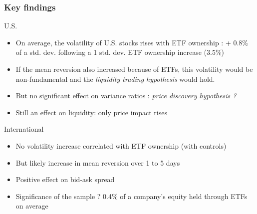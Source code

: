 \documentclass[handout, 9pt, usenames, dvipsnames]{beamer}
\begin{document}
\begin{frame}
  \frametitle{Key findings}
  \begin{block}{U.S.}
  \begin{itemize}
  \item On average, the volatility of U.S. stocks rises with ETF ownership : + 0.8\% of a std. dev. following a 1 std. dev. ETF ownership increase (3.5\%)
  \item If the mean reversion also increased because of ETFs, this volatility would be non-fundamental and the \emph{liquidity trading hypothesis} would hold.
  \item But no significant effect on variance ratios : \emph{price discovery hypothesis ?}
  \item Still an effect on liquidity: only price impact rises
  \end{itemize}
  \end{block}
  \begin{block}{International}
    \begin{itemize}
    \item No volatility increase correlated with ETF ownership (with controls)
      \item But likely increase in mean reversion over 1 to 5 days
      \item Positive effect on bid-ask spread
      \item Significance of the sample ? 0.4\% of a company's equity held through ETFs on average
    \end{itemize}
  \end{block}
\end{frame}
\end{document}
